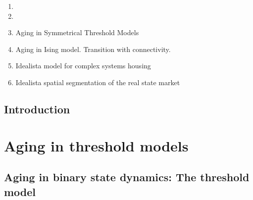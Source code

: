 \documentclass[
	11pt, %
	fleqn, %
	b5paper,
]{LegrandOrangeBook}
\begin{document}
\begin{enumerate}
	\item {}
	\vspace{0.5 cm}
	\item {}
	\vspace{0.5 cm}
	\item Aging in Symmetrical Threshold Models
	\vspace{0.5 cm}
	\item Aging in Ising model. Transition with connectivity.
	\vspace{0.5 cm}
	\item Idealista model for complex systems housing
	\vspace{0.5 cm}
	\item Idealista spatial segmentation of the real state market
	\vspace{0.5 cm}
\end{enumerate}


\chapterspaceabove{6.75cm}
\chapterspacebelow{7.25cm}

\chapter{Introduction}



\part{Aging in threshold models}

\chapterspaceabove{6.75cm}
\chapterspacebelow{7.25cm}

\chapter{Aging in binary state dynamics: The threshold model}

\end{document}
